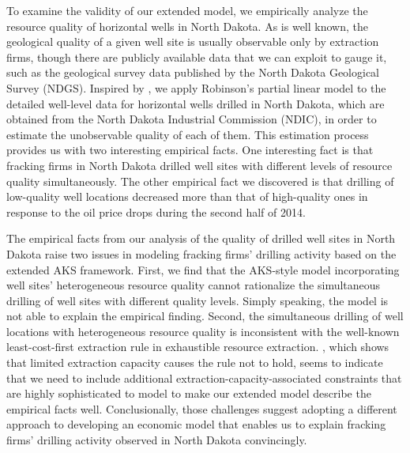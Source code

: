 To examine the validity of our extended model, we empirically analyze the resource quality of horizontal wells in North Dakota. As is well known, the geological quality of a given well site is usually observable only by extraction firms, though there are publicly available data that we can exploit to gauge it, such as the geological survey data published by the North Dakota Geological Survey (NDGS). Inspired by \cite{The-Economics-of-Time-Limited-Development-Options_2020_Herrnstadt-Kellogg-and-Lewis}, we apply Robinson's partial linear model to the detailed well-level data for horizontal wells drilled in North Dakota, which are obtained from the North Dakota Industrial Commission (NDIC), in order to estimate the unobservable quality of each of them. This estimation process provides us with two interesting empirical facts. One interesting fact is that fracking firms in North Dakota drilled well sites with different levels of resource quality simultaneously. The other empirical fact we discovered is that drilling of low-quality well locations decreased more than that of high-quality ones in response to the oil price drops during the second half of 2014. 

The empirical facts from our analysis of the quality of drilled well sites in North Dakota raise two issues in modeling fracking firms' drilling activity based on the extended AKS framework. First, we find that the AKS-style model incorporating well sites' heterogeneous resource quality cannot rationalize the simultaneous drilling of well sites with different quality levels. Simply speaking, the model is not able to explain the empirical finding. Second, the simultaneous drilling of well locations with heterogeneous resource quality is inconsistent with the well-known least-cost-first extraction rule in exhaustible resource extraction. \cite{Extraction-Capacity-and-the-Optimal-Order-of-Extraction_Holland_2003}, which shows that limited extraction capacity causes the rule not to hold, seems to indicate that we need to include additional extraction-capacity-associated constraints that are highly sophisticated to model to make our extended model describe the empirical facts well. Conclusionally, those challenges suggest adopting a different approach to developing an economic model that enables us to explain fracking firms' drilling activity observed in North Dakota convincingly. 

